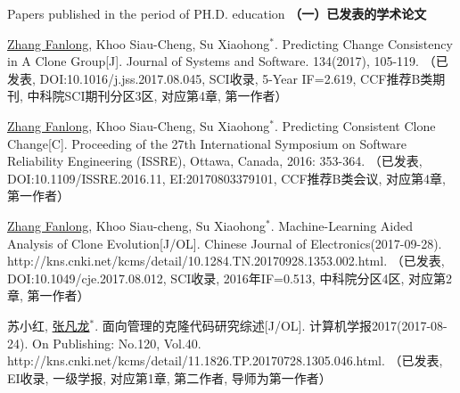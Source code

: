 
 {Papers
published in the period of PH.D. education}
\noindent\textbf{（一）已发表的学术论文}
\begin{publist}

\item
\underline{Zhang Fanlong}, Khoo Siau-Cheng, Su Xiaohong{$^*$}. Predicting Change Consistency in A Clone Group[J]. Journal of Systems and Software. 134(2017), 105-119.
（已发表, DOI:10.1016/j.jss.2017.08.045, SCI收录,  5-Year IF=2.619, CCF推荐B类期刊, 中科院SCI期刊分区3区, 对应第4章, 第一作者）

\item
\underline{Zhang Fanlong}, Khoo Siau-Cheng, Su Xiaohong{$^*$}. Predicting Consistent Clone Change[C]. Proceeding of the 27th International Symposium on Software Reliability Engineering (ISSRE), Ottawa, Canada, 2016: 353-364.
（已发表, DOI:10.1109/ISSRE.2016.11, EI:20170803379101, CCF推荐B类会议, 对应第4章, 第一作者）

\item
\underline{Zhang Fanlong}, Khoo Siau-cheng, Su Xiaohong{$^*$}. Machine-Learning Aided Analysis of Clone Evolution[J/OL]. Chinese Journal of Electronics(2017-09-28). http://kns.cnki.net/kcms/detail/10.1284.TN.20170928.1353.002.html.
（已发表, DOI:10.1049/cje.2017.08.012, SCI收录, 2016年IF=0.513, 中科院分区4区, 对应第2章, 第一作者）


\item
苏小红, \underline{张凡龙}{$^*$}. 面向管理的克隆代码研究综述[J/OL]. 计算机学报2017(2017-08-24). On Publishing: No.120, Vol.40. http://kns.cnki.net/kcms/detail/11.1826.TP.20170728.1305.046.html.
（已发表, EI收录, 一级学报, 对应第1章, 第二作者, 导师为第一作者）



\end{publist}
